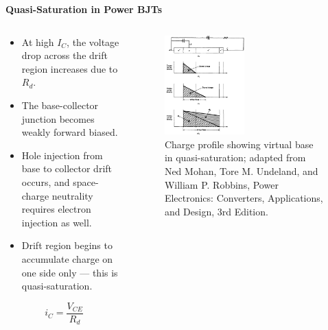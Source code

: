 \begin{frame}{\textbf{Quasi-Saturation in Power BJTs}}
\begin{columns}
\begin{column}{0.55\textwidth}
\begin{itemize}
    \item At high $I_C$, the voltage drop across the drift region increases due to $R_d$.
    \item The base-collector junction becomes weakly forward biased.
    \item Hole injection from base to collector drift occurs, and space-charge neutrality requires electron injection as well.
    \item Drift region begins to accumulate charge on one side only — this is quasi-saturation.
\end{itemize}

\begin{equation}
i_C = \frac{V_{CE}}{R_d}
\end{equation}
\end{column}

\begin{column}{0.45\textwidth}
\begin{figure}
    \centering
    \includegraphics[width=0.5\textwidth]{fig/lec04/BJT_stored_charge_distribution.png}
    \caption{Charge profile showing virtual base in quasi-saturation; adapted from Ned Mohan, Tore M. Undeland, and William P. Robbins, Power Electronics: Converters, Applications, and Design, 3rd Edition.}
\end{figure}
\end{column}
\end{columns}
\end{frame}


